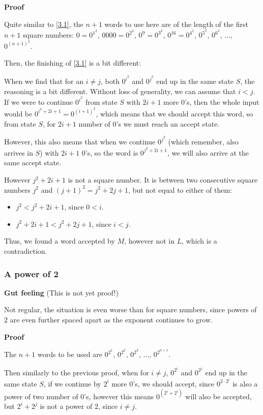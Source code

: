 \textbf{Proof}

 Quite similar to \ref{3.1}, the $n+1$ words to use here are of the length of the first $n+1$ square numbers: $0 = 0^{1^2}$, $0000 = 0^{2^2}$, $0^9 = 0^{3^2}$, $0^{16} = 0^{4^2}$, $0^{5^2}$, $0^{6^2}$, $\dots$, $0^{(n+1)^2}$.
 
Then, the finishing of \ref{3.1} is a bit different:

When we find that for an $i\neq{}j$, both $0^{i^2}$ and $0^{j^2}$ end up in the same state $S$, the reasoning is a bit different. Without loss of generality, we can assume that $i<j$. If we were to continue $0^{i^2}$ from state $S$ with $2i+1$ more $0$'s, then the whole input would be $0^{i^2+2i+1} = 0^{(i+1)^2}$, which means that we should accept this word, so from state $S$, for $2i+1$ number of $0$'s we must reach an accept state.

However, this also means that when we continue $0^{j^2}$ (which remember, also arrives in $S$) with $2i+1$ $0$'s, so the word is $0^{j^2+2i+1}$, we will also arrive at the same accept state.

However $j^2+2i+1$ is not a square number. It is between two consecutive square numbers $j^2$ and $(j+1)^2 = j^2+2j+1$, but not equal to either of them:
\begin{itemize}
    \item $j^2 < j^2 + 2i + 1$, since $0<i$.
    \item $j^2 + 2i + 1 < j^2 + 2j + 1$, since $i<j$.
\end{itemize}

Thus, we found a word accepted by $M$, however not in $L$, which is a contradiction.

\subsubsection{A power of 2}

\textbf{Gut feeling} (This is not yet proof!)

Not regular, the situation is even worse than for square numbers, since powers of $2$ are even further spaced apart as the exponent continues to grow.

\textbf{Proof}

The $n+1$ words to be used are $0^{2^1}$, $0^{2^2}$, $0^{2^3}$, $\dots$, $0^{2^{n+1}}$.

Then similarly to the previous proof, when for $i\neq{}j$, $0^{2^i}$ and $0^{2^j}$ end up in the same state $S$, if we continue by $2^i$ more $0$'s, we should accept, since $0^{2\cdot{}2^i}$ is also a power of two number of $0$'s, however this means  $0^{(2^i + 2^i)}$ will also be accepted, but $2^i + 2^j$ is not a power of $2$, since $i\neq{}j$.